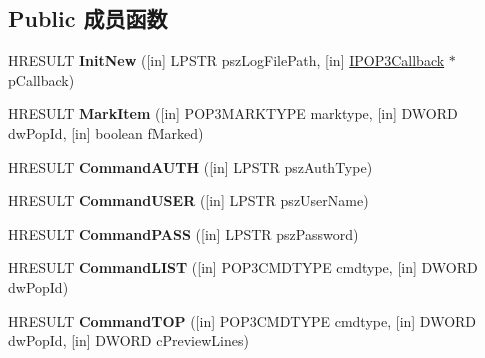 \subsection*{Public 成员函数}
\begin{DoxyCompactItemize}
\item 
\mbox{\label{class_i_p_o_p3_transport_a41c4e3259993bd5a520b9b67bce9883c}} 
H\+R\+E\+S\+U\+LT {\bfseries Init\+New} (\mbox{[}in\mbox{]} L\+P\+S\+TR psz\+Log\+File\+Path, \mbox{[}in\mbox{]} \hyperlink{interface_i_p_o_p3_callback}{I\+P\+O\+P3\+Callback} $\ast$p\+Callback)
\item 
\mbox{\label{class_i_p_o_p3_transport_a9a89aa49206339e314ff7996ea3864c9}} 
H\+R\+E\+S\+U\+LT {\bfseries Mark\+Item} (\mbox{[}in\mbox{]} P\+O\+P3\+M\+A\+R\+K\+T\+Y\+PE marktype, \mbox{[}in\mbox{]} D\+W\+O\+RD dw\+Pop\+Id, \mbox{[}in\mbox{]} boolean f\+Marked)
\item 
\mbox{\label{class_i_p_o_p3_transport_ac73a7963c03b125ec9d1ae3d165aaa1e}} 
H\+R\+E\+S\+U\+LT {\bfseries Command\+A\+U\+TH} (\mbox{[}in\mbox{]} L\+P\+S\+TR psz\+Auth\+Type)
\item 
\mbox{\label{class_i_p_o_p3_transport_a5dfa069f9859278ad2903699d76a821d}} 
H\+R\+E\+S\+U\+LT {\bfseries Command\+U\+S\+ER} (\mbox{[}in\mbox{]} L\+P\+S\+TR psz\+User\+Name)
\item 
\mbox{\label{class_i_p_o_p3_transport_a97fbc144d23afef499a617ffba768107}} 
H\+R\+E\+S\+U\+LT {\bfseries Command\+P\+A\+SS} (\mbox{[}in\mbox{]} L\+P\+S\+TR psz\+Password)
\item 
\mbox{\label{class_i_p_o_p3_transport_a3fe62d893ceabff8a1b34fe65e7c676c}} 
H\+R\+E\+S\+U\+LT {\bfseries Command\+L\+I\+ST} (\mbox{[}in\mbox{]} P\+O\+P3\+C\+M\+D\+T\+Y\+PE cmdtype, \mbox{[}in\mbox{]} D\+W\+O\+RD dw\+Pop\+Id)
\item 
\mbox{\label{class_i_p_o_p3_transport_a9234e18a7d766aea390e9886be556806}} 
H\+R\+E\+S\+U\+LT {\bfseries Command\+T\+OP} (\mbox{[}in\mbox{]} P\+O\+P3\+C\+M\+D\+T\+Y\+PE cmdtype, \mbox{[}in\mbox{]} D\+W\+O\+RD dw\+Pop\+Id, \mbox{[}in\mbox{]} D\+W\+O\+RD c\+Preview\+Lines)

\end{DoxyCompactItemize}
